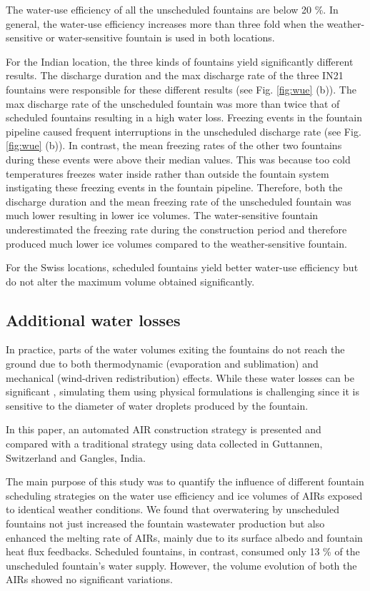 \documentclass[tc, manuscript]{copernicus}
\begin{document}
The water-use efficiency of all the unscheduled fountains are below 20 \%. In general, the water-use efficiency
increases more than three fold when the weather-sensitive or water-sensitive fountain is used in both
locations.  

For the Indian location, the three kinds of fountains yield significantly different results.  The discharge
duration and the max discharge rate of the three IN21 fountains were responsible for these different results
(see Fig. \ref{fig:wue} (b)). The max discharge rate of the unscheduled fountain was more than twice that of
scheduled fountains resulting in a high water loss. Freezing events in the fountain pipeline caused frequent
interruptions in the unscheduled discharge rate (see Fig. \ref{fig:wue} (b)). In contrast, the mean freezing
rates of the other two fountains during these events were above their median values. This was because too cold
temperatures freezes water inside rather than outside the fountain system instigating these freezing events in
the fountain pipeline. Therefore, both the discharge duration and the mean freezing rate of the unscheduled
fountain was much lower resulting in lower ice volumes. The water-sensitive fountain underestimated the freezing
rate during the construction period and therefore produced much lower ice volumes compared to the
weather-sensitive fountain. 

For the Swiss locations, scheduled fountains yield better water-use efficiency but do not alter the maximum
volume obtained significantly. 


\subsection{Additional water losses}

In practice, parts of the water volumes exiting the fountains do not reach the ground due to both thermodynamic
(evaporation and sublimation) and mechanical (wind-driven redistribution) effects. While these water losses can
be significant \citep{hanzerSimulationSnowManagement2020}, simulating them using physical formulations is
challenging since it is sensitive to the diameter of water droplets produced by the fountain.


\conclusions

In this paper, an automated AIR construction strategy is presented and compared with a traditional strategy
using data collected in Guttannen, Switzerland and Gangles, India.

The main purpose of this study was to quantify the influence of different fountain scheduling strategies on the
water use efficiency and ice volumes of AIRs exposed to identical weather conditions. We found that overwatering by
unscheduled fountains not just increased the fountain wastewater production but also enhanced the melting rate
of AIRs, mainly due to its surface albedo and fountain heat flux feedbacks. Scheduled fountains, in contrast,
consumed only 13 \% of the unscheduled fountain's water supply. However, the volume evolution of both the AIRs
showed no significant variations. 
\end{document}

